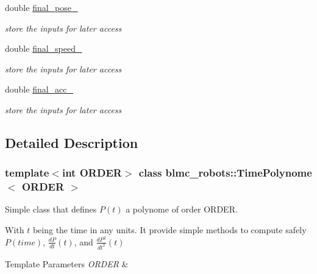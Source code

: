 \begin{DoxyCompactItemize}
double \hyperlink{classblmc__robots_1_1TimePolynome_a427d2e970b5944d0f4cd6170aca99cc5}{final\+\_\+pose\+\_\+}
\begin{DoxyCompactList}\small\item\em store the inputs for later access \end{DoxyCompactList}\item 
\mbox{\label{classblmc__robots_1_1TimePolynome_ac20c24571ce32d08834bc4d0530ed5e3}} 
double \hyperlink{classblmc__robots_1_1TimePolynome_ac20c24571ce32d08834bc4d0530ed5e3}{final\+\_\+speed\+\_\+}
\begin{DoxyCompactList}\small\item\em store the inputs for later access \end{DoxyCompactList}\item 
\mbox{\label{classblmc__robots_1_1TimePolynome_acdd91502f4a2e71f70539d1087347067}} 
double \hyperlink{classblmc__robots_1_1TimePolynome_acdd91502f4a2e71f70539d1087347067}{final\+\_\+acc\+\_\+}
\begin{DoxyCompactList}\small\item\em store the inputs for later access \end{DoxyCompactList}\end{DoxyCompactItemize}


\subsection{Detailed Description}
\subsubsection*{template$<$int O\+R\+D\+ER$>$\newline
class blmc\+\_\+robots\+::\+Time\+Polynome$<$ O\+R\+D\+E\+R $>$}

Simple class that defines $ P(t) $ a polynome of order O\+R\+D\+ER. 

With $ t $ being the time in any units. It provide simple methods to compute safely $ P(time) $, $ \frac{dP}{dt}(t) $, and $ \frac{dP^2}{dt^2}(t) $


\begin{DoxyTemplParams}{Template Parameters}
{\em O\+R\+D\+ER} & \\
\hline
\end{DoxyTemplParams}


